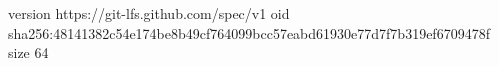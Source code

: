 version https://git-lfs.github.com/spec/v1
oid sha256:48141382c54e174be8b49cf764099bcc57eabd61930e77d7f7b319ef6709478f
size 64
